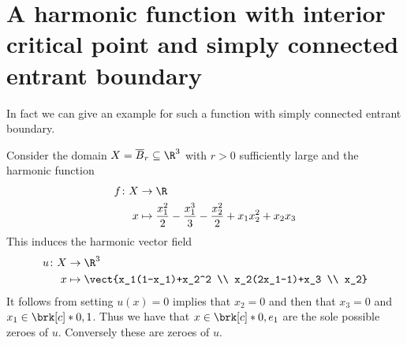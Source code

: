 \section{A harmonic function with interior critical point and simply connected entrant boundary}
In fact we can give an example for such a function with
simply connected entrant boundary.
\begin{example}
  Consider the domain $X=\overline{B}_r\subseteq\R^3$ with $r>0$ sufficiently large and the harmonic function
  \begin{align}
    \begin{aligned}
    f\colon X&\to\R \\
    x&\mapsto \frac{x_1^2}{2}-\frac{x_1^3}{3}-\frac{x_2^2}{2}+x_1x_2^2+x_2x_3
    \end{aligned}
    \label{eq:n3_polynomial_defnf}
  \end{align}
  This induces the harmonic vector field
  \begin{align*}
    u\colon X&\to\R^3 \\
    x&\mapsto\vect{x_1(1-x_1)+x_2^2 \\
      x_2(2x_1-1)+x_3 \\
      x_2}
  \end{align*}
  It follows from setting $u(x)=0$ implies that $x_2=0$
  and then that $x_3=0$ and $x_1\in\brk[c]*{0,1}$. Thus we have that $x\in\brk[c]*{0,e_1}$
  are the sole possible zeroes of $u$. Conversely these are zeroes of $u$.


\end{example}
